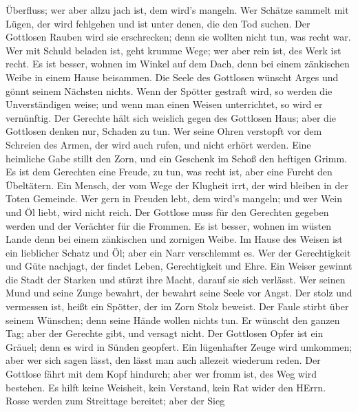 Überfluss; wer aber allzu jach ist, dem wird's mangeln.  Wer
Schätze sammelt mit Lügen, der wird fehlgehen und ist unter denen, die
den Tod suchen.  Der Gottlosen Rauben wird sie erschrecken;
denn sie wollten nicht tun, was recht war.  Wer mit Schuld
beladen ist, geht krumme Wege; wer aber rein ist, des Werk ist recht.
 Es ist besser, wohnen im Winkel auf dem Dach, denn bei
einem zänkischen Weibe in einem Hause beisammen.  Die Seele
des Gottlosen wünscht Arges und gönnt seinem Nächsten nichts.
 Wenn der Spötter gestraft wird, so werden die
Unverständigen weise; und wenn man einen Weisen unterrichtet, so wird er
vernünftig.  Der Gerechte hält sich weislich gegen des
Gottlosen Haus; aber die Gottlosen denken nur, Schaden zu tun.
 Wer seine Ohren verstopft vor dem Schreien des Armen, der
wird auch rufen, und nicht erhört werden.  Eine heimliche
Gabe stillt den Zorn, und ein Geschenk im Schoß den heftigen Grimm.
 Es ist dem Gerechten eine Freude, zu tun, was recht ist,
aber eine Furcht den Übeltätern.  Ein Mensch, der vom Wege
der Klugheit irrt, der wird bleiben in der Toten Gemeinde. 
Wer gern in Freuden lebt, dem wird's mangeln; und wer Wein und Öl liebt,
wird nicht reich.  Der Gottlose muss für den Gerechten
gegeben werden und der Verächter für die Frommen.  Es ist
besser, wohnen im wüsten Lande denn bei einem zänkischen und zornigen
Weibe.  Im Hause des Weisen ist ein lieblicher Schatz und
Öl; aber ein Narr verschlemmt es.  Wer der Gerechtigkeit
und Güte nachjagt, der findet Leben, Gerechtigkeit und Ehre.
 Ein Weiser gewinnt die Stadt der Starken und stürzt ihre
Macht, darauf sie sich verlässt.  Wer seinen Mund und seine
Zunge bewahrt, der bewahrt seine Seele vor Angst.  Der
stolz und vermessen ist, heißt ein Spötter, der im Zorn Stolz beweist.
 Der Faule stirbt über seinem Wünschen; denn seine Hände
wollen nichts tun.  Er wünscht den ganzen Tag; aber der
Gerechte gibt, und versagt nicht.  Der Gottlosen Opfer ist
ein Gräuel; denn es wird in Sünden geopfert.  Ein
lügenhafter Zeuge wird umkommen; aber wer sich sagen lässt, den lässt
man auch allezeit wiederum reden.  Der Gottlose fährt mit
dem Kopf hindurch; aber wer fromm ist, des Weg wird bestehen.
 Es hilft keine Weisheit, kein Verstand, kein Rat wider den
HErrn.  Rosse werden zum Streittage bereitet; aber der Sieg
